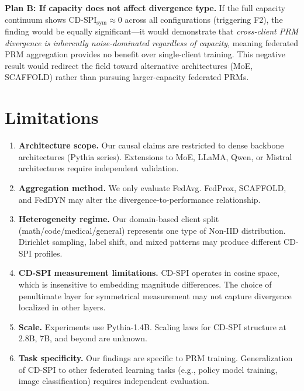 \documentclass{article}
\begin{document}
\textbf{Plan B: If capacity does not affect divergence type.}
If the full capacity continuum shows CD-SPI$_{\text{sym}} \approx 0$ across all configurations (triggering F2), the finding would be equally significant---it would demonstrate that \emph{cross-client PRM divergence is inherently noise-dominated regardless of capacity}, meaning federated PRM aggregation provides no benefit over single-client training.
This negative result would redirect the field toward alternative architectures (MoE, SCAFFOLD) rather than pursuing larger-capacity federated PRMs.

\section{Limitations}
\label{sec:limitations}

\begin{enumerate}
    \item \textbf{Architecture scope.} Our causal claims are restricted to dense backbone architectures (Pythia series).
    Extensions to MoE, LLaMA, Qwen, or Mistral architectures require independent validation.
    \item \textbf{Aggregation method.} We only evaluate FedAvg. FedProx, SCAFFOLD, and FedDYN may alter the divergence-to-performance relationship.
    \item \textbf{Heterogeneity regime.} Our domain-based client split (math/code/medical/general) represents one type of Non-IID distribution.
    Dirichlet sampling, label shift, and mixed patterns may produce different CD-SPI profiles.
    \item \textbf{CD-SPI measurement limitations.} CD-SPI operates in cosine space, which is insensitive to embedding magnitude differences.
    The choice of penultimate layer for symmetrical measurement may not capture divergence localized in other layers.
    \item \textbf{Scale.} Experiments use Pythia-1.4B. Scaling laws for CD-SPI structure at 2.8B, 7B, and beyond are unknown.
    \item \textbf{Task specificity.} Our findings are specific to PRM training. Generalization of CD-SPI to other federated learning tasks (e.g., policy model training, image classification) requires independent evaluation.
\end{enumerate}

\end{document}

